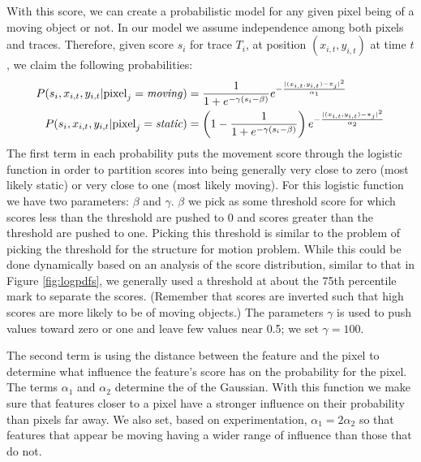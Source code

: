 With this score, we can create a probabilistic model for any given pixel being
of a moving object or not.  In our model we assume independence among both
pixels and traces.  Therefore, given score $s_i$ for trace $T_i$, at position
$(x_{i,t},y_{i,t})$ at time $t$, we claim the following probabilities:
\begin{align}
	P(s_i,x_{i,t},y_{i,t}|{\rm pixel}_j = {\it moving})  &= \frac{1}{1 + e^{-\gamma(s_i - \beta)}} e^{- \frac{|(x_{i,t},y_{i,t}) - \pi_j|^2}{\alpha_1}}
	\\ P(s_i,x_{i,t},y_{i,t}|{\rm pixel}_j = {\it static})  &= \left( 1 - \frac{1}{1 + e^{-\gamma(s_i - \beta)}}\right) e^{- \frac{|(x_{i,t},y_{i,t}) - \pi_j|^2}{\alpha_2}}
\end{align}
The first term in each probability puts the movement score through the logistic
function in order to partition scores into being generally very close to zero
(most likely static) or very close to one (most likely moving).  For this
logistic function we have two parameters: $\beta$ and $\gamma$.  $\beta$ we
pick as some threshold score for which scores less than the threshold are
pushed to 0 and scores greater than the threshold are pushed to one.  Picking
this threshold is similar to the problem of picking the threshold for the
structure for motion problem.  While this could be done dynamically based on an
analysis of the score distribution, similar to that in Figure
\ref{fig:logpdfs}, we generally used a threshold at about the 75th percentile
mark to separate the scores.  (Remember that scores are inverted such that high
scores are more likely to be of moving objects.)  The parameters $\gamma$ is
used to push values toward zero or one and leave few values near 0.5; we set
$\gamma = 100$.

The second term is  using the distance between
the feature and the pixel to determine what influence the feature's score has
on the probability for the pixel.  The terms $\alpha_1$ and $\alpha_2$
determine the  of the Gaussian.  With this function we make sure
that features closer to a pixel have a stronger influence on their probability
than pixels far away.  We also set, based on experimentation, $\alpha_1 =
2\alpha_2$ so that features that appear be moving having a wider range of
influence than those that do not.


